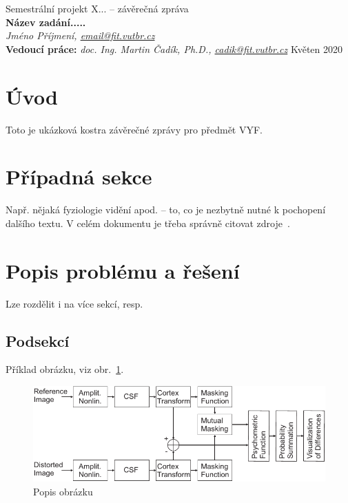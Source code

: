\documentclass[11pt,a4paper,oneside]{article}
\begin{document}
\thispagestyle{empty}
\begin{center}
\vspace*{60mm}
{Semestrální projekt X... -- závěrečná zpráva }\\
\smallskip
{\Large\bf Název zadání.....}\\
\smallskip
{\it Jméno Příjmení, \url{email@fit.vutbr.cz}}\\
\vfill
{\bf Vedoucí práce:} {\it doc. Ing. Martin Čadík, Ph.D., \url{cadik@fit.vutbr.cz}} 
\hfill {Květen 2020}



\end{center}
\newpage


\section{Úvod}
Toto je ukázková kostra závěrečné zprávy pro předmět VYF.



\section{Případná sekce}
Např. nějaká fyziologie vidění apod. -- to, co je nezbytně nutné k pochopení
dalšího textu. V celém dokumentu je třeba správně citovat 
zdroje~\cite{Daly:1993:VDP:197765.197783}.


\section{Popis problému a řešení}
Lze rozdělit i na více sekcí, resp. 

\subsection{Podsekcí}
Příklad obrázku, viz obr.~\ref{fig:vdp}.


\begin{figure}[htb]
  \begin{center}
    \includegraphics{fig/vdp}
    \caption{Popis obrázku} 
    \label{fig:vdp}
  \end{center}
\end{figure}
\end{document}

